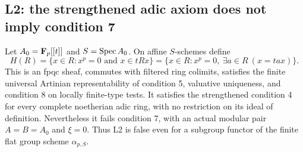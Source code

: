 \subsection{L2: the strengthened adic axiom does not imply condition 7}

\begin{theorem}
\label{A:L2-counterexample}
Let $A_0=\mathbf F_p[[t]]$ and $S=\operatorname{Spec} A_0$. On affine $S$-schemes define
\[
 H(R)=\{x\in R:x^p=0\text{ and }x\in tRx\}
     =\{x\in R:x^p=0,\ \exists a\in R\ (x=tax)\}.       \tag{A.2.3}
\]
This is an fpqc sheaf, commutes with filtered ring colimits, satisfies
the finite universal Artinian representability of condition 5,
valuative uniqueness, and condition 8 on locally finite-type tests.
It satisfies the strengthened condition 4 for every complete
noetherian adic ring, with no restriction on its ideal of definition.
Nevertheless it fails condition 7, with an actual modular pair
$A=B=A_0$ and $\xi=0$. Thus L2 is false even for a subgroup functor
of the finite flat group scheme $\alpha_{p,S}$.
\end{theorem}
